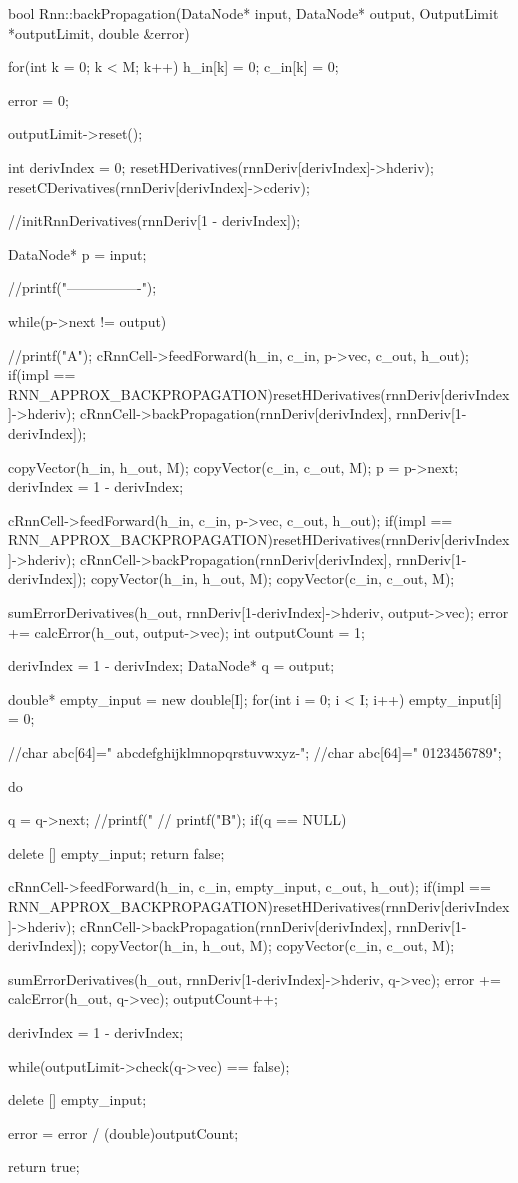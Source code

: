 bool Rnn::backPropagation(DataNode* input, DataNode* output, OutputLimit *outputLimit, double &error){

  for(int k = 0; k < M; k++){
    h_in[k] = 0;
    c_in[k] = 0;
  }

  error = 0;

  outputLimit->reset();

  int derivIndex = 0;
  resetHDerivatives(rnnDeriv[derivIndex]->hderiv);
  resetCDerivatives(rnnDeriv[derivIndex]->cderiv);

  //initRnnDerivatives(rnnDeriv[1 - derivIndex]);

  DataNode* p = input;


//printf("----------------\n");

  while(p->next != output){
    //printf("A");
    cRnnCell->feedForward(h_in, c_in, p->vec, c_out, h_out);
    if(impl == RNN_APPROX_BACKPROPAGATION)resetHDerivatives(rnnDeriv[derivIndex]->hderiv);
    cRnnCell->backPropagation(rnnDeriv[derivIndex], rnnDeriv[1-derivIndex]);

    copyVector(h_in, h_out, M);
    copyVector(c_in, c_out, M);
    p = p->next;
    derivIndex = 1 - derivIndex;
  }



  cRnnCell->feedForward(h_in, c_in, p->vec, c_out, h_out);
  if(impl == RNN_APPROX_BACKPROPAGATION)resetHDerivatives(rnnDeriv[derivIndex]->hderiv);
  cRnnCell->backPropagation(rnnDeriv[derivIndex], rnnDeriv[1-derivIndex]);
  copyVector(h_in, h_out, M);
  copyVector(c_in, c_out, M);

  sumErrorDerivatives(h_out, rnnDeriv[1-derivIndex]->hderiv, output->vec);
  error += calcError(h_out, output->vec);
  int outputCount = 1;


  derivIndex = 1 - derivIndex;
  DataNode* q = output;

  double* empty_input = new double[I];
  for(int i = 0; i < I; i++)
   empty_input[i] = 0;

   //char abc[64]=" abcdefghijklmnopqrstuvwxyz-";
   //char abc[64]=" 0123456789";

   do{

     q = q->next;
     //printf("%
    // printf("B");
     if(q == NULL) {

       delete [] empty_input;
       return false;
     }

     cRnnCell->feedForward(h_in, c_in, empty_input, c_out, h_out);
     if(impl == RNN_APPROX_BACKPROPAGATION)resetHDerivatives(rnnDeriv[derivIndex]->hderiv);
     cRnnCell->backPropagation(rnnDeriv[derivIndex], rnnDeriv[1-derivIndex]);
     copyVector(h_in, h_out, M);
     copyVector(c_in, c_out, M);

     sumErrorDerivatives(h_out, rnnDeriv[1-derivIndex]->hderiv, q->vec);
     error += calcError(h_out, q->vec);
     outputCount++;

     derivIndex = 1 - derivIndex;

   }while(outputLimit->check(q->vec) == false);


   delete [] empty_input;

   error = error / (double)outputCount;

   return true;

}

